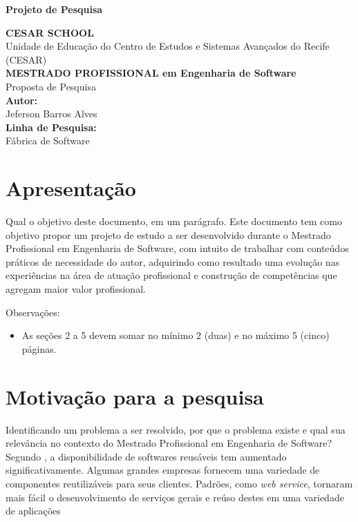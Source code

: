 \documentclass[10pt,a4paper]{article}
\begin{document}
\begin{titlepage}
\begin{center}{\bf \Large Projeto de Pesquisa}\\[3.5cm]
\end{center}
\begin{flushright}
{\bf CESAR SCHOOL}\\
{Unidade de Educação do Centro de Estudos e Sistemas Avançados do Recife}
{(CESAR)}\\[3.5cm]
{\bf \large MESTRADO PROFISSIONAL em Engenharia de Software}\\
{Proposta de Pesquisa}\\[2.5cm] 
{\bf Autor:}\\
{Jeferson Barros Alves}\\[0.8cm]
{\bf Linha de Pesquisa:}\\
{Fábrica de Software}\\[0.8cm]
\end{flushright}
\end{titlepage}
 
\tableofcontents

\newpage

\section{Apresentação}
Qual o objetivo deste documento, em um parágrafo.
Este documento tem como objetivo propor um projeto de estudo a ser desenvolvido durante o Mestrado Profissional em Engenharia de Software, com intuito de trabalhar com conteúdos práticos de necessidade do autor, adquirindo como resultado uma evolução nas experiências na área de atuação profissional e construção de competências que agregam maior valor profissional.

Observações:
\begin{itemize}
\item As seções 2 a 5 devem somar no mínimo 2 (duas) e no máximo 5 (cinco) páginas.
\end{itemize}
\section{Motivação para a pesquisa}
Identificando um problema a ser resolvido, \cite{Mazo2012} por que o problema existe e qual sua relevância
no contexto do Mestrado Profissional em Engenharia de Software?
Segundo \cite{Sommerville2011}, a disponibilidade de softwares reusáveis tem aumentado significativamente. Algumas grandes empresas fornecem uma variedade de componentes reutilizáveis para seus clientes. Padrões, como \textit{web service}, tornaram mais fácil o desenvolvimento de serviços gerais e reúso destes em uma variedade de aplicações
\end{document}
